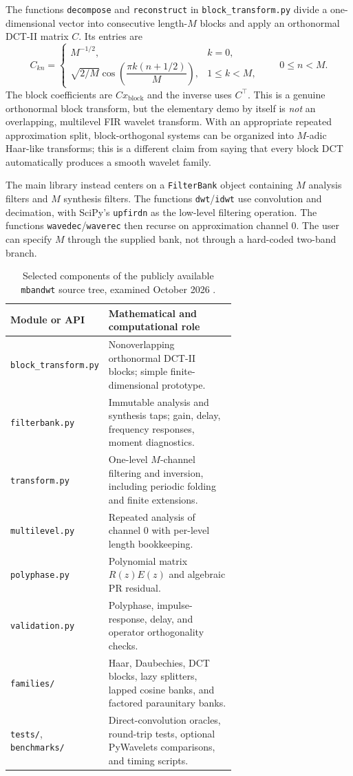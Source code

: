 \documentclass{article}
\theoremstyle{definition}
\theoremstyle{remark}
\newcommand{\code}[1]{\texttt{#1}}
\begin{document}
The functions \code{decompose} and \code{reconstruct} in \code{block\_transform.py} divide a one-dimensional vector into consecutive length-$M$ blocks and apply an orthonormal DCT-II matrix $C$. Its entries are
\begin{equation}
C_{kn}=\begin{cases}
 M^{-1/2},&k=0,\\[2pt]
 \sqrt{2/M}\cos\!\left(\dfrac{\pi k(n+1/2)}M\right),&1\le k<M,
\end{cases}
\qquad 0\le n<M.
\label{eq:dct}
\end{equation}
The block coefficients are $Cx_{\mathrm{block}}$ and the inverse uses $C^\top$. This is a genuine orthonormal block transform, but the elementary demo by itself is \emph{not} an overlapping, multilevel FIR wavelet transform. With an appropriate repeated approximation split, block-orthogonal systems can be organized into $M$-adic Haar-like transforms; this is a different claim from saying that every block DCT automatically produces a smooth wavelet family.

The main library instead centers on a \code{FilterBank} object containing $M$ analysis filters and $M$ synthesis filters. The functions \code{dwt}/\code{idwt} use convolution and decimation, with SciPy's \code{upfirdn} as the low-level filtering operation. The functions \code{wavedec}/\code{waverec} then recurse on approximation channel $0$. The user can specify $M$ through the supplied bank, not through a hard-coded two-band branch.

\begin{table}[htbp]
\centering\small
\caption{Selected components of the publicly available \texttt{mbandwt} source tree, examined October 2026 \cite{su2026}.}
\label{tab:code}
\begin{tabular}{@{}lp{0.65\linewidth}@{}}
\toprule
\textbf{Module or API} & \textbf{Mathematical and computational role}\\\midrule
\code{block\_transform.py} & Nonoverlapping orthonormal DCT-II blocks; simple finite-dimensional prototype.\\
\code{filterbank.py} & Immutable analysis and synthesis taps; gain, delay, frequency responses, moment diagnostics.\\
\code{transform.py} & One-level $M$-channel filtering and inversion, including periodic folding and finite extensions.\\
\code{multilevel.py} & Repeated analysis of channel $0$ with per-level length bookkeeping.\\
\code{polyphase.py} & Polynomial matrix $R(z)E(z)$ and algebraic PR residual.\\
\code{validation.py} & Polyphase, impulse-response, delay, and operator orthogonality checks.\\
\code{families/} & Haar, Daubechies, DCT blocks, lazy splitters, lapped cosine banks, and factored paraunitary banks.\\
\code{tests/}, \code{benchmarks/} & Direct-convolution oracles, round-trip tests, optional PyWavelets comparisons, and timing scripts.\\\bottomrule
\end{tabular}
\end{table}
\end{document}
